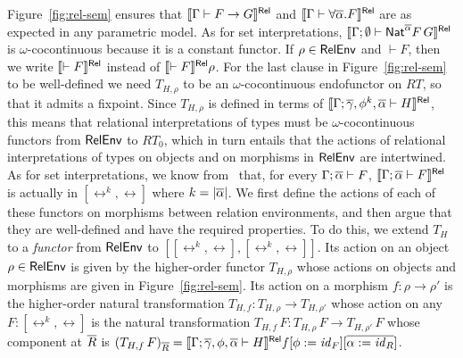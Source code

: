 \documentclass[runningheads]{llncs}
\renewcommand{\id}{\mathit{id}}
\newcommand{\F}{\mathcal{F}}
\renewcommand{\id}{\mathit{id}}
\begin{document}
Figure~\ref{fig:rel-sem} ensures that $\llbracket{\Gamma \vdash F
  \to G}\rrbracket^{\mathsf{Rel}}$ and $\llbracket{\Gamma \vdash \forall \overline{\alpha}. F}\rrbracket^{\mathsf{Rel}}$ are as
expected in any parametric model.
As for set interpretations, $\llbracket{\Gamma; \emptyset \vdash
  \mathsf{Nat}^{\overline{\alpha}} F\,G}\rrbracket^{\mathsf{Rel}}$ is $\omega$-cocontinuous because it is a constant
functor.
If $\rho \in \mathsf{RelEnv}$
and $\vdash F$, then we write $\llbracket{\vdash F}\rrbracket^{\mathsf{Rel}}$ instead of
$\llbracket{\vdash F}\rrbracket^{\mathsf{Rel}}\rho$.  For the last clause in
Figure~\ref{fig:rel-sem} to be well-defined we need $T_{H,\rho}$
to be an $\omega$-cocontinuous endofunctor on $RT$, so that
it admits a fixpoint. Since $T_{H,\rho}$ is
defined in terms of $\llbracket{\Gamma;\overline{\gamma},\phi^k, \overline{\alpha}
  \vdash H}\rrbracket^{\mathsf{Rel}}$, this means that relational interpretations of types must
be $\omega$-cocontinuous functors from $\mathsf{RelEnv}$ to $RT_0$, which in
turn entails that the actions of relational interpretations of types
on objects and on morphisms in $\mathsf{RelEnv}$ are intertwined. As for set
interpretations, we know from~\cite{jp19} that, for every $\Gamma;
\overline{\alpha} \vdash F$, $\llbracket{\Gamma; \overline{\alpha} \vdash F}\rrbracket^{\mathsf{Rel}}$ is
actually in $[\rel^k,\rel]$ where $k = |\overline{\alpha}|$.
We first define the actions of each of these functors on morphisms
between relation environments, and then argue that
they are well-defined and have the required properties. To do this, we
extend $T_H$ to a {\em functor} from $\mathsf{RelEnv}$ to
$[[\rel^k,\rel],[\rel^k,\rel]]$. Its action on an object $\rho \in
\mathsf{RelEnv}$ is given by the higher-order functor $T_{H,\rho}$ whose
actions on objects and morphisms are given in
Figure~\ref{fig:rel-sem}. Its action on a morphism $f : \rho
\to \rho'$ is the higher-order natural transformation $T_{H,f} :
T_{H,\rho} \to T_{H,\rho'}$ whose action on any $F : [\rel^k,\rel]$ is
the natural transformation $T_{H,f}\, F : T_{H,\rho}\, F \to
T_{H,\rho'}\, F$ whose component at $\overline{R}$ is $(T_{H,f}\,
F)_{\ol{R}} = \relsem{\Gamma; \ol\gamma,\phi,\ol{\alpha} \vdash
  H}f[\phi := \id_F][\ol{\alpha := \id_R}]$.
\end{document}
